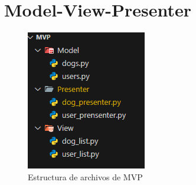 \documentclass[11pt]{article}
\begin{document}
	\newpage \section{Model-View-Presenter}
		\begin{figure}[ht!]
			\centering
			\includegraphics[width=0.3\linewidth]{img/mvp.png}
			\caption{Estructura de archivos de MVP}
			\label{fig:mvp}
		\end{figure}
		
\end{document}
